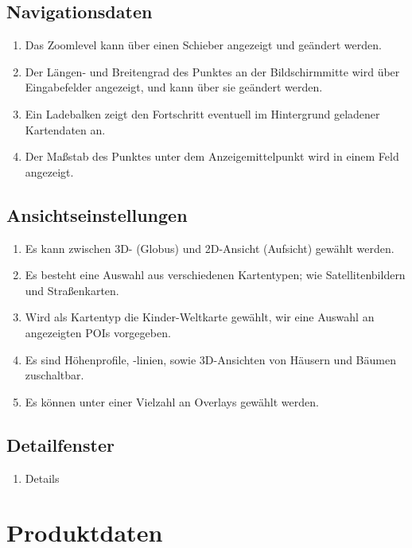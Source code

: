 \documentclass[10pt]{scrreprt}
\begin{document}
\section{Navigationsdaten}
\begin{enumerate}[leftmargin=2cm,resume]
\item Das Zoomlevel kann über einen Schieber angezeigt und geändert werden.
\item Der Längen- und Breitengrad des Punktes an der Bildschirmmitte wird über Eingabefelder angezeigt, und kann über sie geändert werden.
\item Ein Ladebalken zeigt den Fortschritt eventuell im Hintergrund geladener Kartendaten an.
\item Der Maßstab des Punktes unter dem Anzeigemittelpunkt wird in einem Feld angezeigt.
\end{enumerate}

\section{Ansichtseinstellungen}
\begin{enumerate}[leftmargin=2cm,resume]
\item Es kann zwischen 3D- (Globus) und 2D-Ansicht (Aufsicht) gewählt werden.
\item Es besteht eine Auswahl aus verschiedenen Kartentypen; wie Satellitenbildern und Straßenkarten.
\item \W Wird als Kartentyp die Kinder-Weltkarte gewählt, wir eine Auswahl an angezeigten POIs vorgegeben.
\item \W Es sind Höhenprofile, -linien, sowie 3D-Ansichten von Häusern und Bäumen zuschaltbar.
\item Es können unter einer Vielzahl an Overlays gewählt werden.
\end{enumerate}

\section{Detailfenster}
\begin{enumerate}[leftmargin=2cm,resume]
\item Details
\end{enumerate}




\chapter{Produktdaten}
\end{document}
